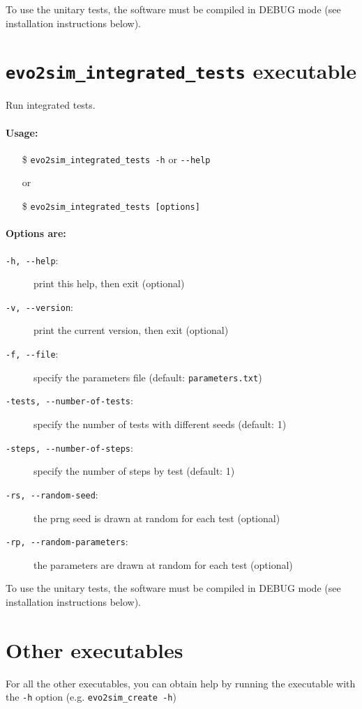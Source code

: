 To use the unitary tests, the software must be compiled in DEBUG mode (see installation instructions below).

\section{\texttt{evo2sim\_integrated\_tests} executable}
Run integrated tests.
\paragraph{Usage:}
\begin{itemize}
        \item[\$] \texttt{evo2sim\_integrated\_tests -h} or \texttt{-{}-help}
        \item[or]
        \item[\$] \texttt{evo2sim\_integrated\_tests [options]}
\end{itemize}
\paragraph{Options are:}
\begin{description}
        \item[\texttt{-h, -{}-help}:] print this help, then exit (optional)
        \item[\texttt{-v, -{}-version}:] print the current version, then exit (optional)
        \item[\texttt{-f, -{}-file}:] specify the parameters file (default: \texttt{parameters.txt})
        \item[\texttt{-tests, -{}-number-of-tests}:] specify the number of tests with different seeds (default: 1)
        \item[\texttt{-steps, -{}-number-of-steps}:] specify the number of steps by test (default: 1)
        \item[\texttt{-rs, -{}-random-seed}:] the prng seed is drawn at random for each test (optional)
        \item[\texttt{-rp, -{}-random-parameters}:] the parameters are drawn at random for each test (optional)
\end{description}

To use the unitary tests, the software must be compiled in DEBUG mode (see installation instructions below).

\section{Other executables}

For all the other executables, you can obtain help by running the executable with the \texttt{-h} option (e.g. \texttt{evo2sim\_create -h})



